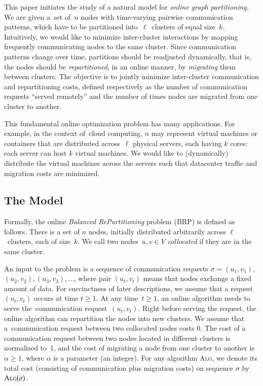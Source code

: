 \documentclass[11pt,a4paper]{scrartcl}
\newcommand{\ALG}{\textsc{Alg}\xspace}
\begin{document}
This paper initiates the study of a natural model for \emph{online graph
partitioning}. We are given a~set of~$n$ nodes with time-varying pairwise
communication patterns, which have to be partitioned into~$\ell$~clusters of
equal size~$k$. Intuitively, we would like to minimize inter-cluster
interactions by mapping frequently communicating nodes to the same cluster.
Since communication patterns change over time, partitions should be
readjusted dynamically, that is, the nodes should be \emph{repartitioned}, in
an online manner, by \emph{migrating} them between clusters. The objective is
to jointly minimize inter-cluster communication and repartitioning costs,
defined respectively as the number of communication requests ``served
remotely'' and the number of times nodes are migrated from one cluster to
another.

This fundamental online optimization problem has many applications. For
example, in the context of~cloud computing, $n$ may represent virtual machines
or containers that are distributed across~$\ell$ physical servers, each having
$k$ cores: each server can host $k$ virtual machines. We would like to
(dynamically) distribute the virtual machines across the servers such that
datacenter traffic and migration costs are minimized.


\subsection{The Model}

Formally, the online \emph{Balanced RePartitioning} problem (BRP) is defined as
follows. There is a set of $n$ nodes, initially distributed arbitrarily
across $\ell$~clusters, each of size~$k$. We call two nodes~$u,v\in V$
\emph{collocated} if they are in the same cluster.

An input to the problem is a sequence of communication requests $\sigma =
(u_1,v_1),$ $(u_2,v_2), (u_3,v_3), \ldots$, where pair $(u_t,v_t)$ means that
nodes exchange a fixed amount of data. For succinctness of later descriptions,
we assume that a request $(u_t,v_t)$ occurs at time $t \geq 1$. At any time~$t
\geq 1$, an online algorithm needs to serve the~communication
request~$(u_t,v_t)$. Right before serving the request, the online algorithm
can repartition the nodes into new clusters. We assume that
a~communication request between two collocated nodes costs 0. The cost of a
communication request between two nodes located in different clusters is
normalized to~1, and the cost of migrating a node from one cluster to another
is~$\alpha \geq 1$, where $\alpha$ is a parameter (an integer). For any
algorithm \ALG, we denote its total cost (consisting of communication plus
migration costs) on sequence $\sigma$ by $\ALG(\sigma)$.
\end{document}
